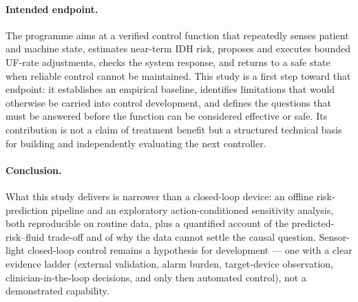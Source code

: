 \documentclass{article}
\begin{document}
\paragraph{Intended endpoint.} The programme aims at a verified control function that repeatedly senses patient and machine
state, estimates near-term IDH risk, proposes and executes bounded UF-rate adjustments, checks the system response, and returns
to a safe state when reliable control cannot be maintained. This study is a first step toward that endpoint: it establishes an
empirical baseline, identifies limitations that would otherwise be carried into control development, and defines the questions
that must be answered before the function can be considered effective or safe. Its contribution is not a claim of treatment
benefit but a structured technical basis for building and independently evaluating the next controller.

\paragraph{Conclusion.} What this study delivers is narrower than a closed-loop device: an offline risk-prediction pipeline
and an exploratory action-conditioned sensitivity analysis, both reproducible on routine data, plus a quantified account of
the predicted-risk--fluid trade-off and of why the data cannot settle the causal question. Sensor-light closed-loop control
remains a hypothesis for development --- one with a clear evidence ladder (external validation, alarm burden, target-device
observation, clinician-in-the-loop decisions, and only then automated control), not a demonstrated capability.



\end{document}
